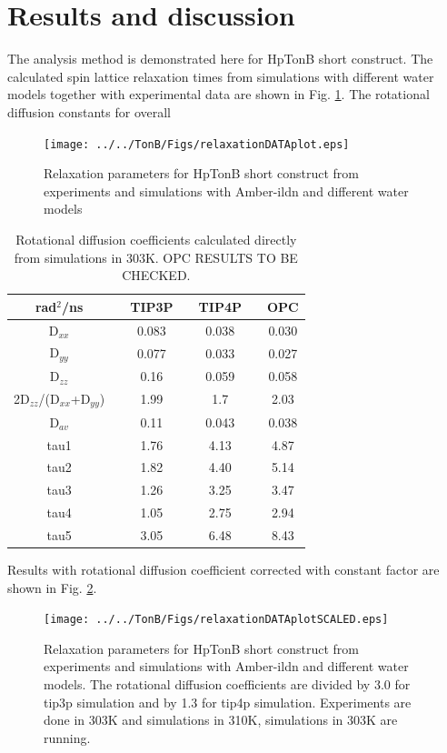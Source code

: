 \documentclass[pre,aps,floatfix,authordate1-4]{revtex4-1}
\begin{document}
\section{Results and discussion}

The analysis method is demonstrated here for HpTonB short construct.
The calculated spin lattice relaxation times from simulations with different
water models together with experimental data \cite{??} are shown in Fig. \ref{relaxationDATAplot}.
The rotational diffusion constants for overall 

\begin{figure}[!h]
  \texttt{[image: ../../TonB/Figs/relaxationDATAplot.eps]}%
  \caption{Relaxation parameters for HpTonB short construct from
    experiments and simulations with Amber-ildn and different water models
    \label{relaxationDATAplot}}%
\end{figure}

\begin{table}[htb]
\centering
\caption{Rotational diffusion coefficients calculated directly from simulations in 303K.
  OPC RESULTS TO BE CHECKED.
}\label{ROTdiffCOEFFS}
\begin{tabular}{c c c c c c c }
  rad$^2$/ns   &    &  TIP3P  &   &   TIP4P   &  &   OPC \\
  \hline
  D$_{xx}$    &   &   0.083   &   &   0.038   &  &   0.030 \\
  D$_{yy}$   &    &  0.077   &    &   0.033   &  &   0.027 \\
  D$_{zz}$   &    &  0.16    &    &   0.059   &  &    0.058 \\
  2D$_{zz}$/(D$_{xx}$+D$_{yy}$) &  &   1.99    &  & 1.7    &	&  2.03 \\
  D$_{av}$  &    &   0.11    &    &   0.043   &  &   0.038 \\
  tau1     &  &  1.76	 &       &   4.13    &   &   4.87 \\
  tau2     &  &  1.82	 &       &   4.40    &   &   5.14 \\
  tau3     &  &  1.26	&        &   3.25    &   &   3.47 \\
  tau4     &  &  1.05	 &       &    2.75   &   &  2.94 \\
  tau5     &  &  3.05	 &       &    6.48   &   &   8.43 \\
  
\end{tabular}
\end{table} 

Results with rotational diffusion coefficient corrected with constant factor
are shown in Fig. \ref{relaxationDATAplotSCALED}. 
\begin{figure}[!h]
  \texttt{[image: ../../TonB/Figs/relaxationDATAplotSCALED.eps]}%
  \caption{Relaxation parameters for HpTonB short construct from
    experiments and simulations with Amber-ildn and different water models.
    The rotational diffusion coefficients are divided by 3.0 for tip3p simulation
    and by 1.3 for tip4p simulation.
    Experiments are done in 303K and simulations in 310K, simulations in 303K are running.
    \label{relaxationDATAplotSCALED}}%
\end{figure}
\end{document}
